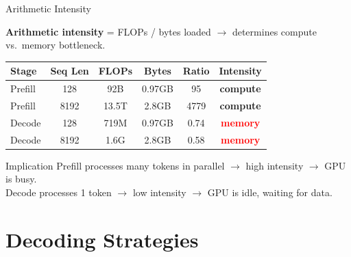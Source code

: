 \documentclass[aspectratio=169, 11pt]{beamer}
\begin{document}
\begin{frame}{Arithmetic Intensity}

	\textbf{Arithmetic intensity} = FLOPs / bytes loaded $\rightarrow$ determines compute vs.\ memory bottleneck.

	\begin{center}
		\begin{tabular}{@{}lccccc@{}}
			\toprule
			\textbf{Stage} & \textbf{Seq Len} & \textbf{FLOPs} & \textbf{Bytes}   & \textbf{Ratio}& \textbf{Intensity}                                     \\
			\midrule
			Prefill        & 128              & 92B            & 0.97GB         & 95 & \quad\textcolor{green!60!black}{\textbf{compute}}   \\
			Prefill        & 8192             & 13.5T          & 2.8GB          & 4779 & \quad\textcolor{green!60!black}{\textbf{compute}} \\
			\midrule
			Decode         & 128              & 719M           & 0.97GB         & 0.74 & \quad\textcolor{red}{\textbf{memory}}             \\
			Decode         & 8192             & 1.6G           & 2.8GB          & 0.58 & \quad\textcolor{red}{\textbf{memory}}             \\
			\bottomrule
		\end{tabular}
	\end{center}

	\begin{alertblock}{Implication}
		Prefill processes many tokens in parallel $\rightarrow$ high intensity $\rightarrow$ GPU is busy.\\
		Decode processes 1 token $\rightarrow$ low intensity $\rightarrow$ GPU is idle, waiting for data.
	\end{alertblock}

\end{frame}

\section{Decoding Strategies}
\end{document}
